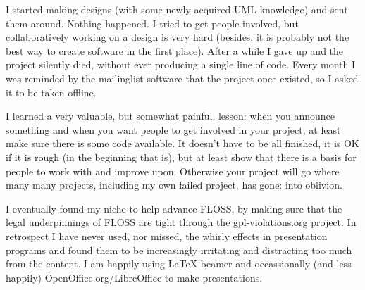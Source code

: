 I started making designs (with some newly acquired UML knowledge) and sent them around. Nothing happened. I tried to get people involved, but collaboratively working on a design is very hard (besides, it is probably not the best way to create software in the first place). After a while I gave up and the project silently died, without ever producing a single line of code. Every month I was reminded by the mailinglist software that the project once existed, so I asked it to be taken offline.

I learned a very valuable, but somewhat painful, lesson: when you announce something and when you want people to get involved in your project, at least make sure there is some code available. It doesn't have to be all finished, it is OK if it is rough (in the beginning that is), but at least show that there is a basis for people to work with and improve upon. Otherwise your project will go where many many projects, including my own failed project, has gone: into oblivion.

I eventually found my niche to help advance FLOSS, by making sure that the legal underpinnings of FLOSS are tight through the gpl-violations.org project. In retrospect I have never used, nor missed, the whirly effects in presentation programs and found them to be increasingly irritating and distracting too much from the content. I am happily using LaTeX beamer and occassionally (and less happily) OpenOffice.org/LibreOffice to make presentations.